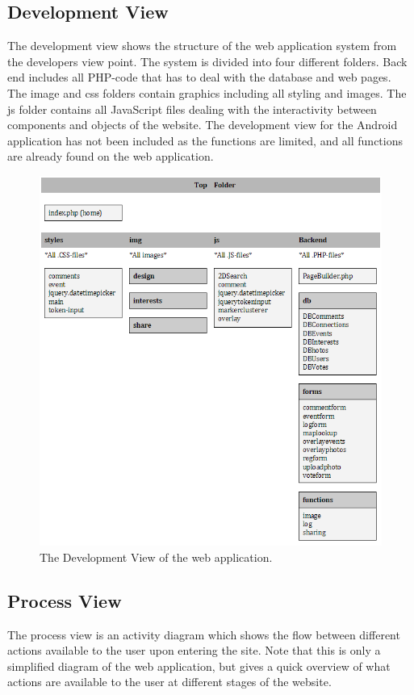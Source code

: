 \subsection{Development View}
\label{subsec:ArchViewsDevelopment}
The development view shows the structure of the web application system from the developers view point. The system is divided into four different folders. Back end includes all PHP-code that has to deal with the database and web pages. The image and css folders contain graphics including all styling and images. The js folder contains all JavaScript files dealing with the interactivity between components and objects of the website. The development view for the Android application has not been included as the functions are limited, and all functions are already found on the web application.

\begin{figure}
\centering
\includegraphics[width=\linewidth]{./Architecture/img/DevelopmentView.png}
\caption{The Development View of the web application. \label{overflow}}
\end{figure}

\subsection{Process View}
\label{subsec:ArchViewsProcess}
The process view is an activity diagram which shows the flow between different actions available to the user upon entering the site. Note that this is only a simplified diagram of the web application, but gives a quick overview of what actions are available to the user at different stages of the website. 

